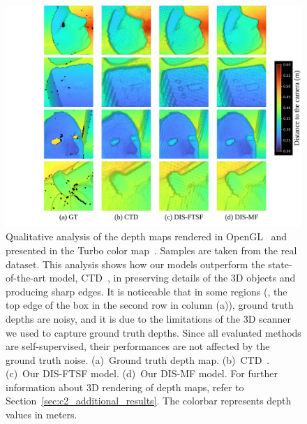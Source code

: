 \begin{figure}[t]
    \begin{center}
    \includegraphics[width=1.0\linewidth]{images/chapter2/supp_figures/rendered_real.jpg}
    \end{center}
   \caption{Qualitative analysis of the depth maps rendered in OpenGL~\citep{shreiner2013opengl} and presented in the Turbo color map~\citep{mikhailov2019turbo}. Samples are taken from the real dataset. This analysis shows how our models outperform the state-of-the-art model, CTD~\citep{riegler2019connecting}, in preserving details of the 3D objects and producing sharp edges. It is noticeable that in some regions (\eg, the top edge of the box in the second row in column (a)), ground truth depths are noisy, and it is due to the limitations of the 3D scanner we used to capture ground truth depths. Since all evaluated methods are self-supervised, their performances are not affected by the ground truth noise. (a)~Ground truth depth map. (b)~CTD~\citep{riegler2019connecting}. (c)~Our DIS-FTSF model. (d)~Our DIS-MF model. For further information about 3D rendering of depth maps, refer to Section~\ref{sec:c2_additional_results}. The colorbar represents depth values in meters.}
    \label{fig:c2_rendered_real}
\end{figure}

